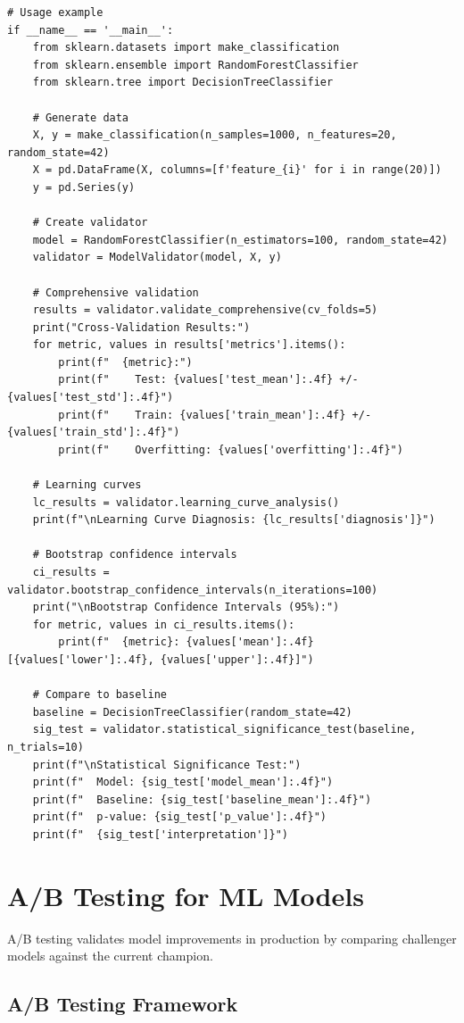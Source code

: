 \begin{lstlisting}[style=python, caption=Comprehensive model validation framework]
# Usage example
if __name__ == '__main__':
    from sklearn.datasets import make_classification
    from sklearn.ensemble import RandomForestClassifier
    from sklearn.tree import DecisionTreeClassifier

    # Generate data
    X, y = make_classification(n_samples=1000, n_features=20, random_state=42)
    X = pd.DataFrame(X, columns=[f'feature_{i}' for i in range(20)])
    y = pd.Series(y)

    # Create validator
    model = RandomForestClassifier(n_estimators=100, random_state=42)
    validator = ModelValidator(model, X, y)

    # Comprehensive validation
    results = validator.validate_comprehensive(cv_folds=5)
    print("Cross-Validation Results:")
    for metric, values in results['metrics'].items():
        print(f"  {metric}:")
        print(f"    Test: {values['test_mean']:.4f} +/- {values['test_std']:.4f}")
        print(f"    Train: {values['train_mean']:.4f} +/- {values['train_std']:.4f}")
        print(f"    Overfitting: {values['overfitting']:.4f}")

    # Learning curves
    lc_results = validator.learning_curve_analysis()
    print(f"\nLearning Curve Diagnosis: {lc_results['diagnosis']}")

    # Bootstrap confidence intervals
    ci_results = validator.bootstrap_confidence_intervals(n_iterations=100)
    print("\nBootstrap Confidence Intervals (95%):")
    for metric, values in ci_results.items():
        print(f"  {metric}: {values['mean']:.4f} [{values['lower']:.4f}, {values['upper']:.4f}]")

    # Compare to baseline
    baseline = DecisionTreeClassifier(random_state=42)
    sig_test = validator.statistical_significance_test(baseline, n_trials=10)
    print(f"\nStatistical Significance Test:")
    print(f"  Model: {sig_test['model_mean']:.4f}")
    print(f"  Baseline: {sig_test['baseline_mean']:.4f}")
    print(f"  p-value: {sig_test['p_value']:.4f}")
    print(f"  {sig_test['interpretation']}")
\end{lstlisting}

\section{A/B Testing for ML Models}

A/B testing validates model improvements in production by comparing challenger models against the current champion.

\subsection{A/B Testing Framework}

